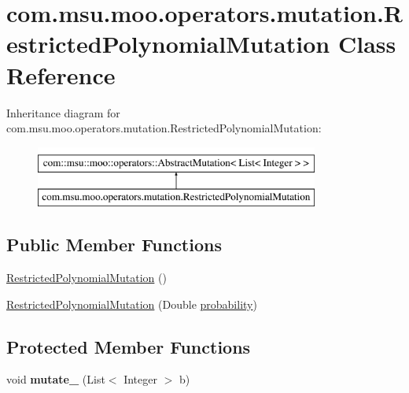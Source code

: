 \hypertarget{classcom_1_1msu_1_1moo_1_1operators_1_1mutation_1_1RestrictedPolynomialMutation}{\section{com.\-msu.\-moo.\-operators.\-mutation.\-Restricted\-Polynomial\-Mutation Class Reference}
\label{classcom_1_1msu_1_1moo_1_1operators_1_1mutation_1_1RestrictedPolynomialMutation}
}
Inheritance diagram for com.\-msu.\-moo.\-operators.\-mutation.\-Restricted\-Polynomial\-Mutation\-:\begin{figure}[H]
\begin{center}
\leavevmode
\includegraphics[height=2.000000cm]{classcom_1_1msu_1_1moo_1_1operators_1_1mutation_1_1RestrictedPolynomialMutation}
\end{center}
\end{figure}
\subsection*{Public Member Functions}
\begin{DoxyCompactItemize}
\item 
\hyperlink{classcom_1_1msu_1_1moo_1_1operators_1_1mutation_1_1RestrictedPolynomialMutation_ae9864b40662ace354ddbd9e64679ab81}{Restricted\-Polynomial\-Mutation} ()
\item 
\hyperlink{classcom_1_1msu_1_1moo_1_1operators_1_1mutation_1_1RestrictedPolynomialMutation_ae9be3ac0bef17c893da91a5022394332}{Restricted\-Polynomial\-Mutation} (Double \hyperlink{classcom_1_1msu_1_1moo_1_1operators_1_1mutation_1_1RestrictedPolynomialMutation_a1f8ad0e089b42b3641b6e79ae6a5fcba}{probability})
\end{DoxyCompactItemize}
\subsection*{Protected Member Functions}
\begin{DoxyCompactItemize}
\item 
\hypertarget{classcom_1_1msu_1_1moo_1_1operators_1_1mutation_1_1RestrictedPolynomialMutation_af8c71ae956c098bafc7c55887af940f0}{void {\bfseries mutate\-\_\-} (List$<$ Integer $>$ b)}\label{classcom_1_1msu_1_1moo_1_1operators_1_1mutation_1_1RestrictedPolynomialMutation_af8c71ae956c098bafc7c55887af940f0}

\end{DoxyCompactItemize}
